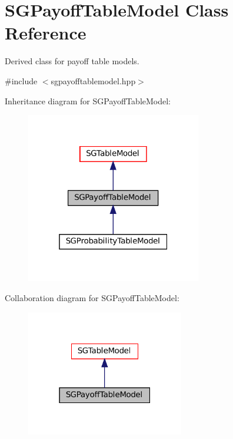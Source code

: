\hypertarget{classSGPayoffTableModel}{}\section{S\+G\+Payoff\+Table\+Model Class Reference}
\label{classSGPayoffTableModel}


Derived class for payoff table models.  




{\ttfamily \#include $<$sgpayofftablemodel.\+hpp$>$}



Inheritance diagram for S\+G\+Payoff\+Table\+Model\+:
\nopagebreak
\begin{figure}[H]
\begin{center}
\leavevmode
\includegraphics[width=217pt]{classSGPayoffTableModel__inherit__graph}
\end{center}
\end{figure}


Collaboration diagram for S\+G\+Payoff\+Table\+Model\+:
\nopagebreak
\begin{figure}[H]
\begin{center}
\leavevmode
\includegraphics[width=195pt]{classSGPayoffTableModel__coll__graph}
\end{center}
\end{figure}
